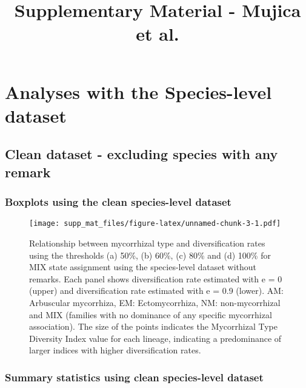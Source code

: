 \documentclass[]{article}
\title{Supplementary Material - Mujica et al.}
\author{}
\date{}
\begin{document}
\maketitle

\setcounter{table}{0}  \renewcommand{\thetable}{S\arabic{table}} \setcounter{figure}{0} \renewcommand{\thefigure}{S\arabic{figure}}

\hypertarget{analyses-with-the-species-level-dataset}{%
\section{Analyses with the Species-level
dataset}\label{analyses-with-the-species-level-dataset}}

\hypertarget{clean-dataset---excluding-species-with-any-remark}{%
\subsection{Clean dataset - excluding species with any
remark}\label{clean-dataset---excluding-species-with-any-remark}}

\hypertarget{boxplots-using-the-clean-species-level-dataset}{%
\subsubsection{Boxplots using the clean species-level
dataset}\label{boxplots-using-the-clean-species-level-dataset}}

\begin{figure}
\centering
\texttt{[image: supp\_mat\_files/figure-latex/unnamed-chunk-3-1.pdf]}
\caption{Relationship between mycorrhizal type and diversification rates
using the thresholds (a) 50\%, (b) 60\%, (c) 80\% and (d) 100\% for MIX
state assignment using the species-level dataset without remarks. Each
panel shows diversification rate estimated with e = 0 (upper) and
diversification rate estimated with e = 0.9 (lower). AM: Arbuscular
mycorrhiza, EM: Ectomycorrhiza, NM: non-mycorrhizal and MIX (families
with no dominance of any specific mycorrhizal association). The size of
the points indicates the Mycorrhizal Type Diversity Index value for each
lineage, indicating a predominance of larger indices with higher
diversification rates.}
\end{figure}

\hypertarget{summary-statistics-using-clean-species-level-dataset}{%
\subsubsection{Summary statistics using clean species-level
dataset}\label{summary-statistics-using-clean-species-level-dataset}}
\end{document}

